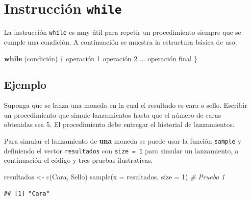 \documentclass[
]{book}
\newenvironment{Shaded}{\begin{snugshade}}{\end{snugshade}}
\newcommand{\AttributeTok}[1]{\textcolor[rgb]{0.77,0.63,0.00}{#1}}
\newcommand{\CommentTok}[1]{\textcolor[rgb]{0.56,0.35,0.01}{\textit{#1}}}
\newcommand{\ControlFlowTok}[1]{\textcolor[rgb]{0.13,0.29,0.53}{\textbf{#1}}}
\newcommand{\DecValTok}[1]{\textcolor[rgb]{0.00,0.00,0.81}{#1}}
\newcommand{\FunctionTok}[1]{\textcolor[rgb]{0.00,0.00,0.00}{#1}}
\newcommand{\NormalTok}[1]{#1}
\newcommand{\OtherTok}[1]{\textcolor[rgb]{0.56,0.35,0.01}{#1}}
\newcommand{\StringTok}[1]{\textcolor[rgb]{0.31,0.60,0.02}{#1}}
\begin{document}
\hypertarget{instrucciuxf3n-while}{%
\section{\texorpdfstring{Instrucción \texttt{while}}{Instrucción while}}\label{instrucciuxf3n-while}}

La instrucción \texttt{while} es muy útil para repetir un procedimiento siempre que se cumple una condición. A continuación se muestra la estructura básica de uso.

\begin{Shaded}
\begin{Highlighting}[]
\ControlFlowTok{while}\NormalTok{ (condición) \{}
\NormalTok{  operación }\DecValTok{1}
\NormalTok{  operación }\DecValTok{2}
\NormalTok{  ...}
\NormalTok{  operación final}
\NormalTok{\}}
\end{Highlighting}
\end{Shaded}

\hypertarget{ejemplo-18}{%
\subsection*{Ejemplo}\label{ejemplo-18}}

Suponga que se lanza una moneda en la cual el resultado es cara o sello. Escribir un procedimiento que simule lanzamientos hasta que el número de caras obtenidas sea 5. El procedimiento debe entregar el historial de lanzamientos.

Para simular el lanzamiento de \textbf{una} moneda se puede usar la función \texttt{sample} y definiendo el vector \texttt{resultados} con \texttt{size\ =\ 1} para simular un lanzamiento, a continuación el código y tres pruebas ilustrativas.

\begin{Shaded}
\begin{Highlighting}[]
\NormalTok{resultados }\OtherTok{\textless{}{-}} \FunctionTok{c}\NormalTok{(}\StringTok{\textquotesingle{}Cara\textquotesingle{}}\NormalTok{, }\StringTok{\textquotesingle{}Sello\textquotesingle{}}\NormalTok{)}
\FunctionTok{sample}\NormalTok{(}\AttributeTok{x =}\NormalTok{ resultados, }\AttributeTok{size =} \DecValTok{1}\NormalTok{)  }\CommentTok{\# Prueba 1}
\end{Highlighting}
\end{Shaded}

\begin{verbatim}
## [1] "Cara"
\end{verbatim}
\end{document}
